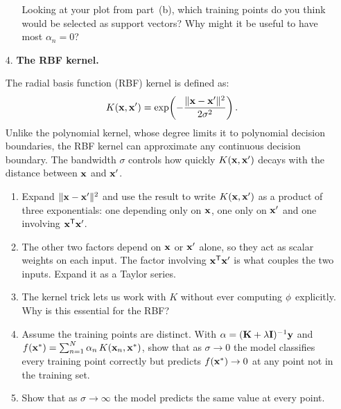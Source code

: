 \documentclass[submit]{../harvardml}
\begin{document}
\begin{problem}
\begin{enumerate}
\begin{enumerate}
    Looking at your plot from part~(b), which training points do you
    think would be selected as support vectors? Why might it be
    useful to have most $\alpha_n = 0$?
  \end{enumerate}

  \item[4.] \textbf{The RBF kernel.}

  The radial basis function (RBF) kernel is defined as:
  \[
    K(\mathbf{x}, \mathbf{x}') = \exp\!\left(-\frac{\|\mathbf{x} - \mathbf{x}'\|^2}{2\sigma^2}\right).
  \]
  Unlike the polynomial kernel, whose degree limits it to polynomial
  decision boundaries, the RBF kernel can approximate any continuous
  decision boundary. The bandwidth $\sigma$ controls how quickly
  $K(\mathbf{x}, \mathbf{x}')$ decays with the distance between $\mathbf{x}$
  and $\mathbf{x}'$.

  \begin{enumerate}
    \item Expand $\|\mathbf{x} - \mathbf{x}'\|^2$ and use the result to write
    $K(\mathbf{x}, \mathbf{x}')$ as a product of three exponentials: one
    depending only on $\mathbf{x}$, one only on $\mathbf{x}'$ and one
    involving $\mathbf{x}^{\mathsf{T}} \mathbf{x}'$.

    \item The other two factors depend on $\mathbf{x}$ or $\mathbf{x}'$ alone,
    so they act as scalar weights on each input. The factor involving
    $\mathbf{x}^{\mathsf{T}} \mathbf{x}'$ is what couples the two inputs. Expand it
    as a Taylor series.

    \item The kernel trick lets us work with $K$ without ever
    computing $\mathbf{\phi}$ explicitly. Why is this essential for the RBF?

    \item Assume the training points are distinct. With
    $\mathbf{\alpha} = (\mathbf{K} + \lambda \mathbf{I})^{-1} \mathbf{y}$ and
    $f(\mathbf{x}^*) = \sum_{n=1}^N \alpha_n \, K(\mathbf{x}_n, \mathbf{x}^*)$,
    show that as $\sigma \to 0$ the model classifies every training
    point correctly but predicts $f(\mathbf{x}^*) \to 0$ at any point
    not in the training set.

    \item Show that as $\sigma \to \infty$ the model predicts the
    same value at every point.
  \end{enumerate}

\end{enumerate}
\end{problem}

\newpage
\end{document}
